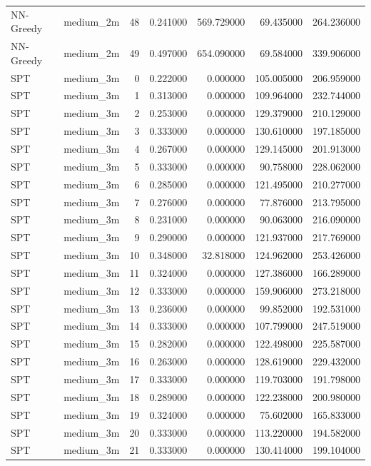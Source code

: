 \begin{tabular}{llrrrrr}
NN-Greedy & medium_2m & 48 & 0.241000 & 569.729000 & 69.435000 & 264.236000 \\
NN-Greedy & medium_2m & 49 & 0.497000 & 654.090000 & 69.584000 & 339.906000 \\
SPT & medium_3m & 0 & 0.222000 & 0.000000 & 105.005000 & 206.959000 \\
SPT & medium_3m & 1 & 0.313000 & 0.000000 & 109.964000 & 232.744000 \\
SPT & medium_3m & 2 & 0.253000 & 0.000000 & 129.379000 & 210.129000 \\
SPT & medium_3m & 3 & 0.333000 & 0.000000 & 130.610000 & 197.185000 \\
SPT & medium_3m & 4 & 0.267000 & 0.000000 & 129.145000 & 201.913000 \\
SPT & medium_3m & 5 & 0.333000 & 0.000000 & 90.758000 & 228.062000 \\
SPT & medium_3m & 6 & 0.285000 & 0.000000 & 121.495000 & 210.277000 \\
SPT & medium_3m & 7 & 0.276000 & 0.000000 & 77.876000 & 213.795000 \\
SPT & medium_3m & 8 & 0.231000 & 0.000000 & 90.063000 & 216.090000 \\
SPT & medium_3m & 9 & 0.290000 & 0.000000 & 121.937000 & 217.769000 \\
SPT & medium_3m & 10 & 0.348000 & 32.818000 & 124.962000 & 253.426000 \\
SPT & medium_3m & 11 & 0.324000 & 0.000000 & 127.386000 & 166.289000 \\
SPT & medium_3m & 12 & 0.333000 & 0.000000 & 159.906000 & 273.218000 \\
SPT & medium_3m & 13 & 0.236000 & 0.000000 & 99.852000 & 192.531000 \\
SPT & medium_3m & 14 & 0.333000 & 0.000000 & 107.799000 & 247.519000 \\
SPT & medium_3m & 15 & 0.282000 & 0.000000 & 122.498000 & 225.587000 \\
SPT & medium_3m & 16 & 0.263000 & 0.000000 & 128.619000 & 229.432000 \\
SPT & medium_3m & 17 & 0.333000 & 0.000000 & 119.703000 & 191.798000 \\
SPT & medium_3m & 18 & 0.289000 & 0.000000 & 122.238000 & 200.980000 \\
SPT & medium_3m & 19 & 0.324000 & 0.000000 & 75.602000 & 165.833000 \\
SPT & medium_3m & 20 & 0.333000 & 0.000000 & 113.220000 & 194.582000 \\
SPT & medium_3m & 21 & 0.333000 & 0.000000 & 130.414000 & 199.104000 \\

\end{tabular}
